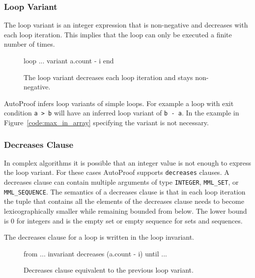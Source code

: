\documentclass[a4paper,12pt]{article}
\newcommand{\AutoProof}{Auto\-Proof\xspace}
\newcommand{\e}[1]{\mbox{\lstinline[language=Eiffel]|#1|}}
\begin{document}
\subsubsection*{Loop Variant}

The loop variant is an integer expression that is non-negative and decreases with each loop iteration. This implies that the loop can only be executed a finite number of times.

\begin{figure}
\begin{erunning}
loop ...
variant
	a.count - i
end
\end{erunning}
\hspace{0.5cm}
\caption*{The loop variant decreases each loop iteration and stays non-negative.}
\end{figure}

\AutoProof infers loop variants of simple loops. For example a loop with exit condition \e{a > b} will have an inferred loop variant of \e{b - a}. In the example in Figure~\ref{code:max_in_array} specifying the variant is not necessary.

\subsubsection*{Decreases Clause}

In complex algorithms it is possible that an integer value is not enough to express the loop variant. For these cases \AutoProof supports \e{decreases} clauses. A decreases clause can contain multiple arguments of type \e{INTEGER}, \e{MML_SET}, or \e{MML_SEQUENCE}. The semantics of a decreases clause is that in each loop iteration the tuple that contains all the elements of the decreases clause needs to become lexicographically smaller while remaining bounded from below. The lower bound is 0 for integers and is the empty set or empty sequence for sets and sequences.

The decreases clause for a loop is written in the loop invariant.

\begin{figure}
\begin{erunning}
from ...
invariant
	decreases (a.count - i)
until ...
\end{erunning}
\hspace{0.5cm}
\caption*{Decreases clause equivalent to the previous loop variant.}
\end{figure}
\end{document}
